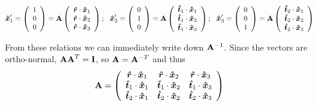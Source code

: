 \documentclass[12pt]{article}
\begin{document}
$$
\bm{{\hat x}}_1' = \left(\begin{array}{c} 1 \\ 0 \\0\end{array}\right) = {\bf A}\left(\begin{array}{c} \bm{{\hat r}}\cdot \bm{{\hat x}}_1 \\ \bm{{\hat r}}\cdot \bm{{\hat x}}_2 \\\bm{{\hat r}}\cdot \bm{{\hat x}}_3\end{array}\right);~~
\bm{{\hat x}}_2' = \left(\begin{array}{c} 0 \\ 1 \\0\end{array}\right) = {\bf A}\left(\begin{array}{c}\bm{{\hat t}}_1\cdot \bm{{\hat x}}_1 \\ \bm{{\hat t}}_1 \cdot\bm{{\hat x}}_2 \\\bm{{\hat t}}_1 \cdot \bm{{\hat x}}_3 \end{array}\right);~~
\bm{{\hat x}}_3' = \left(\begin{array}{c} 0 \\ 0 \\1 \end{array}\right)= {\bf A}\left(\begin{array}{c}\bm{{\hat t}}_2\cdot \bm{{\hat x}}_1 \\ \bm{{\hat t}}_2 \cdot\bm{{\hat x}}_2 \\\bm{{\hat t}}_2 \cdot \bm{{\hat x}}_3 \end{array}\right)
$$

From these relations we can immediately write down 
${\bf A}^{-1}$.  Since the vectors are ortho-normal, 
${\bf A A}^{T} = {\bf I}$, so ${\bf A} = {\bf A}^{-T}$ and thus
\begin{equation}
{\bf A} =  \left(\begin{array}{ccc}  
\bm{{\hat r}}\cdot \bm{{\hat x}}_1 & \bm{{\hat r}}\cdot \bm{{\hat x}}_2 &\bm{{\hat r}}\cdot \bm{{\hat x}}_3 \\
\bm{{\hat t}}_1\cdot \bm{{\hat x}}_1 & \bm{{\hat t}}_1 \cdot\bm{{\hat x}}_2 & \bm{{\hat t}}_1 \cdot \bm{{\hat x}}_3 \\
\bm{{\hat t}}_2\cdot \bm{{\hat x}}_1 & \bm{{\hat t}}_2 \cdot\bm{{\hat x}}_2 & \bm{{\hat t}}_2 \cdot \bm{{\hat x}}_3 
\end{array} 
\right)
\end{equation}
\end{document}

